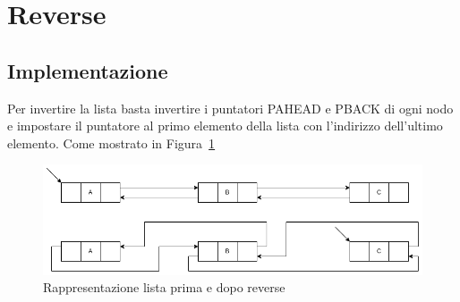 \section{Reverse}
\subsection{Implementazione}
Per invertire la lista basta invertire i puntatori PAHEAD e PBACK di ogni 
nodo e impostare il puntatore al primo elemento della lista con l'indirizzo 
dell'ultimo elemento. Come mostrato in Figura~\ref{fig:reverse}

\begin{figure}[h]
    \centering
    \includegraphics[scale=0.4]{diagrams/reverse.png}
    \caption{Rappresentazione lista prima e dopo reverse}
    \label{fig:reverse}
\end{figure}